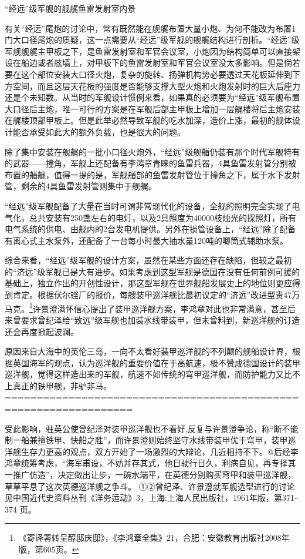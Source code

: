 \documentclass[12pt,UTF8]{ctexbook}
\begin{document}
“经远”级军舰的舰艉鱼雷发射室内景

有关“经远”尾炮的讨论中，常有既然能在舰艉布置大量小炮、为何不能改为布置1门大口径尾炮的质疑，这一点需要从“经远”级军舰的舰艉结构进行剖析。“经远”级军舰舰艉主甲板之下，是鱼雷发射室和军官会议室，小炮因为结构简单可以直接架设在船边或者舷墙上，对甲板下的鱼雷发射室和军官会议室没太多影响。但是倘若要在这个部位安装大口径火炮，复杂的旋转、扬弹机构势必要透过天花板延伸到下方空间，而且这层天花板的强度是否能够支撑大型火炮和火炮发射时的巨大后座力还是个未知数。从当时的军舰设计惯例来看，如果真的必须要为“经远”级军舰布置大口径后主炮，唯一可行的方案是在军舰后部主甲板上增加一层艉楼将后主炮安装在艉楼顶部甲板上。但是此举必然导致军舰的吃水加深，造价上涨，最初的舰体设计能否承受如此大的额外负载，也是很大的问题。

除了集中安装在舰艉的一批小口径火炮外，“经远”级舰艏仍装有那个时代军舰特有的武器——撞角，军舰上还配备有李鸿章青睐的鱼雷兵器，4具鱼雷发射管分别被布置的艏艉，值得一提的是，军舰艏部的鱼雷发射管位于撞角之下，属于水下发射管，剩余的4具鱼雷发射管则集中于舰艉。

“经远”级军舰配备了大量在当时可谓非常现代化的设备，全舰的照明完全实现了电气化，总共安装有250盏左右的电灯，以及2具照度为40000枝烛光的探照灯，所有电气系统的供电、由舰内的2台发电机提供。另外在损管设备上，“经远”除了配备有离心式主水泵外，还配备了一台每小时最大抽水量120吨的唧筒式辅助水泵。

综合来看，“经远”级军舰的设计方案，虽然在某些方面还存在缺陷，但较之最初的“济远”级军舰已是大有进步。如果考虑到这型军舰是德国在没有任何前例可援的基础上，独立作出的开创性设计，那这型军舰在世界舰船发展史上的地位则更应得到肯定。根据伏尔铿厂的报价，每艘装甲巡洋舰比最初议定的“济远”改进型贵47万马克。\footnote{《寄译署转呈醇邸庆邸》，《李鸿章全集》21，合肥：安徽教育出版社2008年版，第605页。}许景澄满怀信心提出了装甲巡洋舰方案，李鸿章对此也非常满意，甚至后来曾要求曾纪泽给“致远”级军舰也加装水线带装甲，但未曾料到，新巡洋舰的订造还会再度掀起波澜。

原因来自大海中的英伦三岛，一向不太看好装甲巡洋舰的不列颠的舰船设计界，根据英国海军的观点，认为巡洋舰的重要价值在于高航速，极不赞成德国设计的装甲巡洋舰，觉得这样造出来的军舰，航速不如传统的穹甲巡洋舰，而防护能力又比不上真正的铁甲舰，非驴非马。
==================================================================


受此影响，驻英公使曾纪泽对装甲巡洋舰也不看好,反复与许景澄争论，称“断不能制一船兼擅铁甲、快船之胜”，而许景澄则始终坚守水线带装甲优于穹甲，装甲巡洋舰生存力更高的观点，双方开始了一场激烈的大辩论，几近相持不下。@后经李鸿章统筹考虑，“海军甫设，不妨并存其式，他日驶行日久，利病自见，再专择其一推广仿造”，决定做出让步，一碗水端平，在英德分别购买穹甲和装甲巡洋舰，草草平息了这次英德巡洋舰之争斗。
①②曾纪泽、许景澄就军舰选型进行的讨论见中国近代史资料丛刊《洋务运动》3，上海:上海人民出版社，1961年版，第371-374 页。
\end{document}
